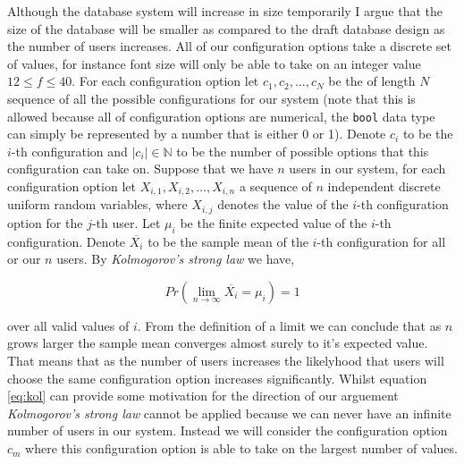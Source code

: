 Although the
database system will increase in size temporarily I argue that
the size of the database will be smaller as compared to the 
draft database design as the number of users increases. All of
our configuration options take a discrete set of values, for 
instance font size will only be able to take on an integer
value $12 \leq f \leq 40$. For each configuration option let
$c_1, c_2, \ldots, c_N$ be the of length $N$ sequence of all
the possible configurations for our 
system (note that this is allowed because all of configuration
options are numerical, the \texttt{bool} data type can simply
be represented by a number that is either 0 or 1). Denote
$c_i$ to be the $i$-th configuration and $|c_i| \in \mathbb{N}$
to be the number of possible options that this configuration 
can take on. Suppose that we have $n$ users in our system,
for each configuration option let
$X_{i, 1}, X_{i, 2}, \ldots, X_{i, n}$ a sequence of $n$
independent discrete uniform random variables, 
where $X_{i, j}$ denotes the value of the $i$-th configuration
option for the $j$-th user. Let $\mu_i$ be the finite expected
value of the $i$-th configuration. Denote $\overline{X_i}$ to 
be the sample mean of the $i$-th configuration for all or our
$n$ users. By \textit{Kolmogorov's strong law} \cite{thm}
we have,

\begin{equation} \label{eq:kol}
  Pr \left(\lim_{n \to \infty} \overline{X_i} = \mu_i \right) = 1
\end{equation}

over all valid values of $i$. From the definition of a limit
we can conclude that as $n$ grows larger the sample mean 
converges almost surely to it's expected value. That means
that as the number of users increases the likelyhood that 
users will choose the same configuration option increases 
significantly. Whilst
equation \ref{eq:kol} can provide some motivation for the 
direction of our arguement \textit{Kolmogorov's strong law}
cannot be applied because we can never have an infinite number
of users in our system. Instead we will consider the
configuration option $c_m$ where this configuration option is
able to take on the largest number of values.\\ \vspace{0.2cm}

